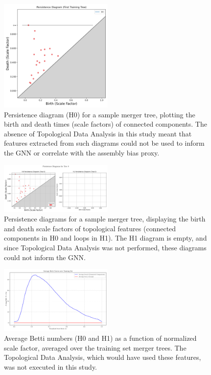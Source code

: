 \documentclass[twocolumn]{aastex631}
\begin{document}
\begin{figure}[htbp]
    \centering
    \includegraphics[width=0.5\textwidth]{../input_files/plots/persistence_diagram_1_1748137556.png}
    \caption{\label{fig:persistence_diagram_h0}Persistence diagram (H0) for a sample merger tree, plotting the birth and death times (scale factors) of connected components. The absence of Topological Data Analysis in this study meant that features extracted from such diagrams could not be used to inform the GNN or correlate with the assembly bias proxy.}
\end{figure}

\begin{figure}[htbp]
    \centering
    \includegraphics[width=0.5\textwidth]{../input_files/plots/persistence_diagram_tree0_20250524214205.png}
    \caption{\label{fig:persistence_diagram_h0_h1}Persistence diagrams for a sample merger tree, displaying the birth and death scale factors of topological features (connected components in H0 and loops in H1). The H1 diagram is empty, and since Topological Data Analysis was not performed, these diagrams could not inform the GNN.}
\end{figure}

\begin{figure}[htbp]
    \centering
    \includegraphics[width=0.5\textwidth]{../input_files/plots/avg_betti_curves_2_1748137556.png}
    \caption{\label{fig:avg_betti_numbers}Average Betti numbers (H0 and H1) as a function of normalized scale factor, averaged over the training set merger trees. The Topological Data Analysis, which would have used these features, was not executed in this study.}
\end{figure}
\end{document}
